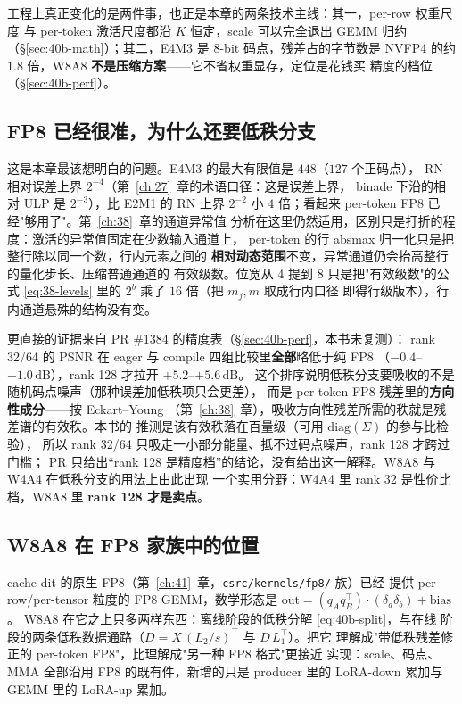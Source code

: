 工程上真正变化的是两件事，也正是本章的两条技术主线：其一，per-row 权重尺度
与 per-token 激活尺度都沿 $K$ 恒定，scale 可以完全退出 GEMM 归约
（\S\ref{sec:40b-math}）；其二，E4M3 是 8-bit 码点，残差占的字节数是 NVFP4
的约 $1.8$ 倍，W8A8 \textbf{不是压缩方案}——它不省权重显存，定位是花钱买
精度的档位（\S\ref{sec:40b-perf}）。

\subsection{FP8 已经很准，为什么还要低秩分支}\label{sec:40b-why-lora}

这是本章最该想明白的问题。E4M3 的最大有限值是 $448$（$127$ 个正码点），
RN 相对误差上界 $2^{-4}$（第~\ref{ch:27}~章的术语口径：这是误差上界，
binade 下沿的相对 ULP 是 $2^{-3}$），比 E2M1 的 RN 上界 $2^{-2}$ 小
$4$ 倍；看起来 per-token FP8 已经"够用了"。第~\ref{ch:38}~章的通道异常值
分析在这里仍然适用，区别只是打折的程度：激活的异常值固定在少数输入通道上，
per-token 的行 absmax 归一化只是把整行除以同一个数，行内元素之间的
\textbf{相对动态范围}不变，异常通道仍会抬高整行的量化步长、压缩普通通道的
有效级数。位宽从 4 提到 8 只是把"有效级数"的公式
\eqref{eq:38-levels} 里的 $2^b$ 乘了 $16$ 倍（把 $m_j,m$ 取成行内口径
即得行级版本），行内通道悬殊的结构没有变。

更直接的证据来自 PR \#1384 的精度表（\S\ref{sec:40b-perf}，本书未复测）：
rank 32/64 的 PSNR 在 eager 与 compile 四组比较里\textbf{全部}略低于纯 FP8
（$-0.4$--$-1.0\,\mathrm{dB}$），rank 128 才拉开 $+5.2$--$+5.6\,\mathrm{dB}$。
这个排序说明低秩分支要吸收的不是随机码点噪声（那种误差加低秩项只会更差），
而是 per-token FP8 残差里的\textbf{方向性成分}——按 Eckart--Young
（第~\ref{ch:38}~章），吸收方向性残差所需的秩就是残差谱的有效秩。本书的
推测是该有效秩落在百量级（可用 $\mathrm{diag}(\Sigma)$ 的参与比检验），
所以 rank 32/64 只吸走一小部分能量、抵不过码点噪声，rank 128 才跨过门槛；
PR 只给出“rank 128 是精度档”的结论，没有给出这一解释。W8A8 与 W4A4
在低秩分支的用法上由此出现
一个实用分野：W4A4 里 rank 32 是性价比档，W8A8 里 \textbf{rank 128 才是卖点}。

\subsection{W8A8 在 FP8 家族中的位置}

cache-dit 的原生 FP8（第~\ref{ch:41}~章，\texttt{csrc/kernels/fp8/} 族）已经
提供 per-row/per-tensor 粒度的 FP8 GEMM，数学形态是
$\mathrm{out}=(q_Aq_B^{\top})\cdot(\delta_a\delta_b)+\mathrm{bias}$。
W8A8 在它之上只多两样东西：离线阶段的低秩分解 \eqref{eq:40b-split}，与在线
阶段的两条低秩数据通路（$D=X\,(L_2/s)^{\top}$ 与 $D\,L_1^{\top}$）。把它
理解成"带低秩残差修正的 per-token FP8"，比理解成"另一种 FP8 格式"更接近
实现：scale、码点、MMA 全部沿用 FP8 的既有件，新增的只是 producer 里的
LoRA-down 累加与 GEMM 里的 LoRA-up 累加。

